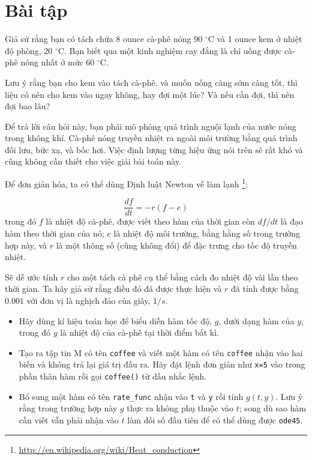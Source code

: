 \documentclass[12pt]{book}
\begin{document}
\section{Bài tập}

\newcommand{\degree}{\ensuremath{^\circ}}

\begin{ex}
Giả sử rằng bạn có tách chứa 8 ounce cà-phê nóng 90 \degree C và
1 ounce kem ở nhiệt độ phòng, 20 \degree C. Bạn biết qua một 
kinh nghiệm cay đắng là chỉ uống được cà-phê nóng nhất ở mức
60 \degree C.

Lưu ý rằng bạn cho kem vào tách cà-phê, và muốn uống càng sớm
càng tốt, thì liệu có nên cho kem vào ngay không, hay đợi một lúc?
Và nếu cần đợi, thì nên đợi bao lâu?

Để trả lời câu hỏi này, bạn phải mô phỏng quá trình nguội lạnh của
nước nóng trong không khí. Cà-phê nóng truyền nhiệt ra ngoài 
môi trường bằng quá trình đối lưu, bức xạ, và bốc hơi. Việc định
lượng từng hiệu ứng nói trên sẽ rất khó và cũng không cần thiết
cho việc giải bài toán này.

Để đơn giản hóa, ta có thể dùng Định luật Newton về làm lạnh
\footnote{\url{http://en.wikipedia.org/wiki/Heat_conduction}}:

\[ \frac{df}{dt} = -r (f - e) \]
%
trong đó $f$ là nhiệt độ cà-phê, được viết theo hàm của thời gian
còn $df/dt$ là đạo hàm theo thời gian của nó; $e$ là nhiệt độ
môi trường, bằng hằng số trong trường hợp này, và $r$ là một
thông số (cũng không đổi) để đặc trưng cho tốc độ truyền nhiệt.

Sẽ dễ ước tính $r$ cho một tách cà phê cụ thể bằng cách đo 
nhiệt độ vài lần theo thời gian. Ta hãy giả sử rằng điều đó đã
được thực hiện và $r$ đã tính được bằng $0.001$ với đơn vị là
nghịch đảo của giây, $1/s$.

\begin{itemize}

\item Hãy dùng kí hiệu toán học để biểu diễn hàm tốc độ, $g$,
dưới dạng hàm của $y$, trong đó $y$ là nhiệt độ của cà-phê
tại thời điểm bất kì.

\item Tạo ra tập tin M có tên {\tt coffee} và viết một hàm có tên
{\tt coffee} nhận vào hai biến và không trả lại giá trị đầu ra.
Hãy đặt lệnh đơn giản như {\tt x=5} vào trong phần thân hàm
rồi gọi  {\tt coffee()} từ dấu nhắc lệnh.

\item Bổ sung một hàm có tên \verb#rate_func# nhận vào 
{\tt t} và {\tt y} rồi tính $g(t,y)$.  Lưu ý rằng trong trường hợp này 
$g$ thực ra không phụ thuộc vào $t$; song dù sao hàm cần viết
vẫn phải nhận vào $t$ làm đối số đầu tiên để có thể dùng được 
{\tt ode45}.


\end{itemize}
\end{ex}
\end{document}
